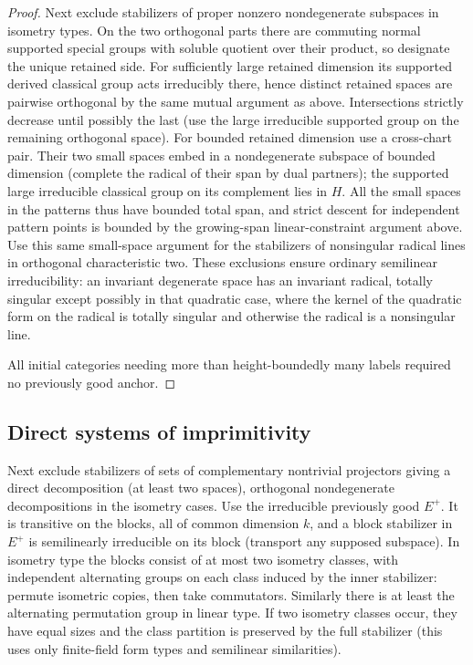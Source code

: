 \begin{proof}
Next exclude stabilizers of proper nonzero nondegenerate subspaces in isometry types. On the two orthogonal parts there are commuting normal supported special groups with soluble quotient over their product, so designate the unique retained side. For sufficiently large retained dimension its supported derived classical group acts irreducibly there, hence distinct retained spaces are pairwise orthogonal by the same mutual argument as above. Intersections strictly decrease until possibly the last (use the large irreducible supported group on the remaining orthogonal space). For bounded retained dimension use a cross-chart pair. Their two small spaces embed in a nondegenerate subspace of bounded dimension (complete the radical of their span by dual partners); the supported large irreducible classical group on its complement lies in \(H\). All the small spaces in the patterns thus have bounded total span, and strict descent for independent pattern points is bounded by the growing-span linear-constraint argument above. Use this same small-space argument for the stabilizers of nonsingular radical lines in orthogonal characteristic two. These exclusions ensure ordinary semilinear irreducibility: an invariant degenerate space has an invariant radical, totally singular except possibly in that quadratic case, where the kernel of the quadratic form on the radical is totally singular and otherwise the radical is a nonsingular line.

All initial categories needing more than height-boundedly many labels required no previously good anchor.
\end{proof}

\subsection{Direct systems of imprimitivity}

\begin{convention}\label{c:direct-configuration}
Next exclude stabilizers of sets of complementary nontrivial projectors giving a direct decomposition (at least two spaces), orthogonal nondegenerate decompositions in the isometry cases. Use the irreducible previously good \(E^+\). It is transitive on the blocks, all of common dimension \(k\), and a block stabilizer in \(E^+\) is semilinearly irreducible on its block (transport any supposed subspace). In isometry type the blocks consist of at most two isometry classes, with independent alternating groups on each class induced by the inner stabilizer: permute isometric copies, then take commutators. Similarly there is at least the alternating permutation group in linear type. If two isometry classes occur, they have equal sizes and the class partition is preserved by the full stabilizer (this uses only finite-field form types and semilinear similarities).
\end{convention}

